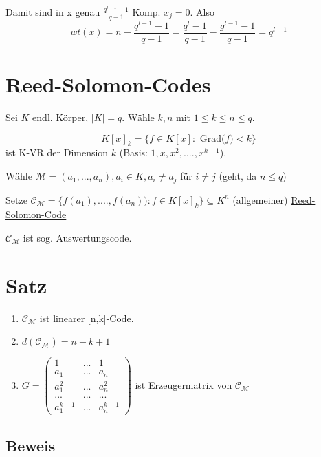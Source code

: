 \documentclass[a4paper, openany]{book}
\begin{document}
Damit sind in x genau $\frac{q^{l-1}-1}{q-1}$ Komp. $x_j = 0$. Also \[ wt(x) = n- \frac{q^{l-1}-1}{q-1} = \frac{q^l -1}{q-1} - \frac{g^{l-1}-1}{q-1} = q^{l-1} \]

\section{Reed-Solomon-Codes}

Sei $K$ endl. Körper, $|K| = q$. Wähle $k,n$ mit $1 \le k \le n \le q$.

\[ K[x]_k = \{f \in K[x] : \text{ Grad($f$)} < k \} \] ist K-VR der Dimension $k$ (Basis: $1,x,x^2,....,x^{k-1}$).

\par \medskip

Wähle $\mathcal{M} = (a_1, ..., a_n), a_i \in K, a_i \neq a_j$ für $i \neq j$ (geht, da $n \le q$)

\par \medskip

Setze $\mathcal{C}_{\mathcal{M}} = \{f(a_1), ...., f(a_n)) : f \in K[x]_k \} \subseteq K^n$ (allgemeiner) \underline{Reed-Solomon-Code}

\par \medskip

$\mathcal{C}_{\mathcal{M}}$ ist sog. Auswertungscode.

\section{Satz}

\begin{enumerate}[label=(\alph*)]
	\item $\mathcal{C}_{\mathcal{M}}$ ist linearer [n,k]-Code.

	\item $d(\mathcal{C}_{\mathcal{M}}) = n-k+1$

	\item $G = \begin{pmatrix}1 & ... & 1 \\ a_1 & ... & a_n \\ a_1^2 & ... & a_n^2 \\ ... & ... & ... \\ a_1^{k-1} & ... & a_n^{k-1} \end{pmatrix}$ ist Erzeugermatrix von $\mathcal{C}_{\mathcal{M}}$
\end{enumerate}

\subsection{Beweis}
\end{document}
